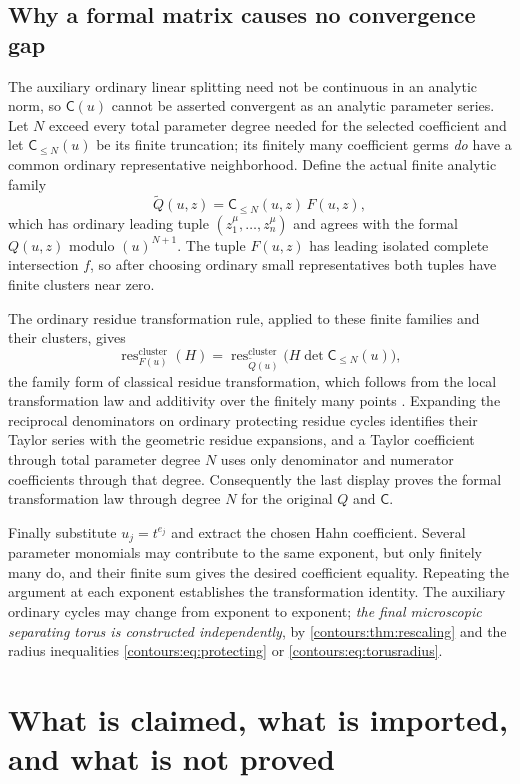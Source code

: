 \documentclass[11pt,letterpaper]{article}
\theoremstyle{definition}
\theoremstyle{remark}
\newcommand{\res}{\operatorname{res}}\newcommand{\wind}{\operatorname{wind}}
\numberwithin{equation}{section}
\begin{document}
\subsection{Why a formal matrix causes no convergence gap}
\label{contours:appsub:formal}
The auxiliary ordinary linear splitting need not be continuous in an analytic norm,
so $\mathsf C(u)$ cannot be asserted convergent as an analytic parameter series. Let
$N$ exceed every total parameter degree needed for the selected coefficient and let
$\mathsf C_{\le N}(u)$ be its finite truncation; its finitely many coefficient germs
\emph{do} have a common ordinary representative neighborhood. Define the actual
finite analytic family
\[
  \widetilde Q(u,z)=\mathsf C_{\le N}(u,z)\,F(u,z),
\]
which has ordinary leading tuple $(z_1^\mu,\ldots,z_n^\mu)$ and agrees with the
formal $Q(u,z)$ modulo $(u)^{N+1}$. The tuple $F(u,z)$ has leading isolated complete
intersection $f$, so after choosing ordinary small representatives both tuples have
finite clusters near zero.

The ordinary residue transformation rule, applied to these finite families and their
clusters, gives
\[
  \res^{\mathrm{cluster}}_{F(u)}(H)
  =\res^{\mathrm{cluster}}_{\widetilde Q(u)}
   \bigl(H\det\mathsf C_{\le N}(u)\bigr),
\]
the family form of classical residue transformation, which follows from the local
transformation law and additivity over the finitely many points \cite{CDS,Tsikh}.
Expanding the reciprocal denominators on ordinary protecting residue cycles
identifies their Taylor series with the geometric residue expansions, and a Taylor
coefficient through total parameter degree $N$ uses only denominator and numerator
coefficients through that degree. Consequently the last display proves the formal
transformation law through degree $N$ for the original $Q$ and $\mathsf C$.

Finally substitute $u_j=t^{e_j}$ and extract the chosen Hahn coefficient. Several
parameter monomials may contribute to the same exponent, but only finitely many do,
and their finite sum gives the desired coefficient equality. Repeating the argument
at each exponent establishes the transformation identity. The auxiliary ordinary
cycles may change from exponent to exponent; \emph{the final microscopic separating
torus is constructed independently}, by \cref{contours:thm:rescaling} and the radius
inequalities \eqref{contours:eq:protecting} or
\eqref{contours:eq:torusradius}.

\section{What is claimed, what is imported, and what is not proved}
\label{contours:app:status}
\end{document}
